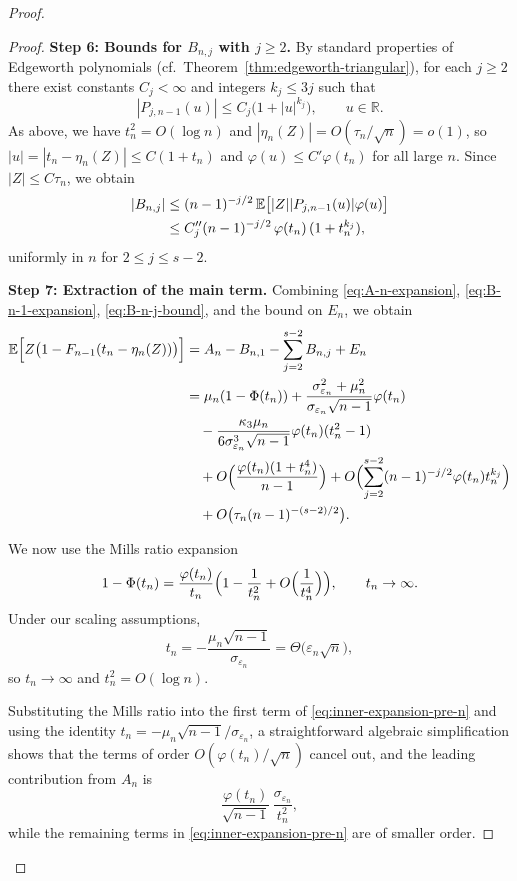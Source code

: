 \documentclass{article}
\theoremstyle{plain}
\theoremstyle{definition}
\begin{document}
\begin{proof}
\begin{proof}
\medskip\noindent\textbf{Step 6: Bounds for $B_{n,j}$ with $j\ge2$.}
By standard properties of Edgeworth polynomials
(cf.~Theorem~\ref{thm:edgeworth-triangular}), for each $j\ge2$ there
exist constants $C_j<\infty$ and integers $k_j\le3j$ such that
\[
  |P_{j,n-1}(u)| \le C_j\bigl(1+|u|^{k_j}\bigr),
  \qquad u\in\mathbb R.
\]
As above, we have $t_n^2=O(\log n)$ and $|\eta_n(Z)|=O(\tau_n/\sqrt{n})=o(1)$, so
$|u|=|t_n-\eta_n(Z)|\le C(1+t_n)$ and
$\varphi(u)\le C'\varphi(t_n)$ for all large $n$. Since $|Z|\le C\tau_n$,
we obtain
\begin{align}
  |B_{n,j}|
  &\le (n-1)^{-j/2}\,
      \mathbb E\bigl[
        |Z||P_{j,n-1}(u)|\varphi(u)
      \bigr]\notag\\
  &\le C_j''(n-1)^{-j/2}\,\varphi(t_n)\,(1+t_n^{k_j}),
  \label{eq:B-n-j-bound}
\end{align}
uniformly in $n$ for $2\le j\le s-2$.

\medskip\noindent\textbf{Step 7: Extraction of the main term.}
Combining \eqref{eq:A-n-expansion}, \eqref{eq:B-n-1-expansion},
\eqref{eq:B-n-j-bound}, and the bound on $E_n$, we obtain
\begin{align}
  \mathbb E\Bigl[
    Z\bigl(1-F_{n-1}(t_n-\eta_n(Z))\bigr)
  \Bigr]
  &= A_n - B_{n,1} - \sum_{j=2}^{s-2}B_{n,j} + E_n\notag\\
  &= \mu_n(1-\Phi(t_n))
     +\frac{\sigma_{\varepsilon_n}^2+\mu_n^2}
            {\sigma_{\varepsilon_n}\sqrt{n-1}}\varphi(t_n)\notag\\
  &\quad
     - \frac{\kappa_3\mu_n}{6\sigma_{\varepsilon_n}^3\sqrt{n-1}}
         \varphi(t_n)(t_n^2-1)\notag\\
  &\quad
     + O\Bigl(
         \frac{\varphi(t_n)(1+t_n^4)}{n-1}
       \Bigr)
     + O\Bigl(
         \sum_{j=2}^{s-2}
           (n-1)^{-j/2}\varphi(t_n)t_n^{k_j}
       \Bigr)\notag\\
  &\quad
     + O\bigl(\tau_n (n-1)^{-(s-2)/2}\bigr).
     \label{eq:inner-expansion-pre-n}
\end{align}

We now use the Mills ratio expansion
\[
  1-\Phi(t_n)
  = \frac{\varphi(t_n)}{t_n}
    \Bigl(1-\frac{1}{t_n^2}
           +O\Bigl(\frac{1}{t_n^4}\Bigr)\Bigr),
  \qquad t_n\to\infty.
\]
Under our scaling assumptions,
\[
  t_n
  = -\frac{\mu_n\sqrt{n-1}}{\sigma_{\varepsilon_n}}
  = \Theta\bigl(\varepsilon_n\sqrt{n}\bigr),
\]
so $t_n\to\infty$ and $t_n^2=O(\log n)$.

Substituting the Mills ratio into the first term of
\eqref{eq:inner-expansion-pre-n} and using the identity
$t_n=-\mu_n\sqrt{n-1}/\sigma_{\varepsilon_n}$, a straightforward
algebraic simplification shows that the terms of order $O(\varphi(t_n)/\sqrt{n})$ cancel out, and the leading contribution from $A_n$ is
\[
  \frac{\varphi(t_n)}{\sqrt{n-1}}\,
  \frac{\sigma_{\varepsilon_n}}{t_n^2},
\]
while the remaining terms in \eqref{eq:inner-expansion-pre-n} are of
smaller order.


\end{proof}
\end{proof}
\end{document}
